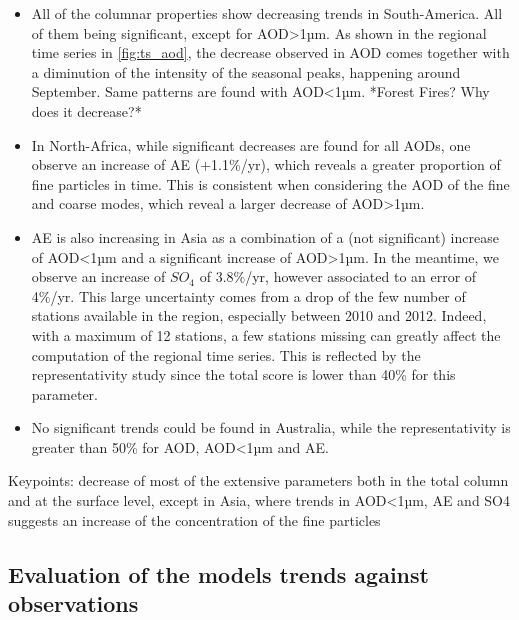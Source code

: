 \documentclass[journal abbreviation, manuscript]{copernicus}
\begin{document}
\begin{itemize}
 \item All of the columnar properties show decreasing trends in South-America. All of them being significant, except for AOD>1µm. As shown in the regional time series in \ref{fig:ts_aod}, the decrease observed in AOD comes together with a diminution of the intensity of the seasonal peaks, happening around September. Same patterns are found with AOD<1µm. *Forest Fires? Why does it decrease?*
 \item In North-Africa, while significant decreases are found for all AODs, one observe an increase of AE (+1.1\%/yr), which reveals a greater proportion of fine particles in time. This is consistent when considering the AOD of the fine and coarse modes, which reveal a larger decrease of AOD>1µm.
 \item AE is also increasing in Asia as a combination of a (not significant) increase of AOD<1µm and a significant increase of AOD>1µm. In the meantime, we observe an increase of $SO_{4}$ of 3.8\%/yr, however associated to an error of 4\%/yr. This large uncertainty comes from a drop of the few number of stations available in the region, especially between 2010 and 2012. Indeed, with a maximum of 12 stations, a few stations missing can greatly affect the computation of the regional time series. This is reflected by the representativity study since the total score is lower than 40\% for this parameter.
 \item No significant trends could be found in Australia, while the representativity is greater than 50\% for AOD, AOD<1µm and AE.

\end{itemize}

Keypoints: decrease of most of the extensive parameters both in the total column and at the surface level, except in Asia, where trends in AOD<1µm, AE and SO4 suggests an increase of the concentration of the fine particles

\subsection{Evaluation of the models trends against observations}
\end{document}
